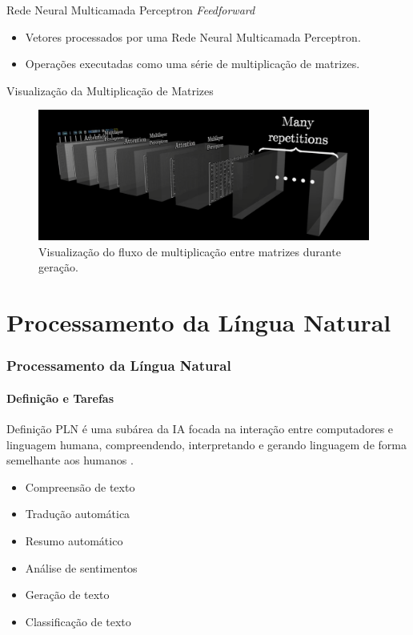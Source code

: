 \documentclass{beamer}
\begin{document}
\begin{frame}{Rede Neural Multicamada Perceptron \textit{Feedforward}}
    \begin{itemize}
        \item Vetores processados por uma Rede Neural Multicamada Perceptron.
        \item Operações executadas como uma série de multiplicação de matrizes.
    \end{itemize}
\end{frame}

\begin{frame}[allowframebreaks]{Visualização da Multiplicação de Matrizes}
    \begin{figure}[!h]
        \centering
        \includegraphics[width=4.3in]{images/Transformer inference in tokens flow.png}
        \caption{Visualização do fluxo de multiplicação entre matrizes durante geração.}
        \label{fig:VisualizacaoMatrizes.}
    \end{figure}
\end{frame}


\section{Processamento da Língua Natural}
\begin{frame}
    \frametitle{Processamento da Língua Natural}
    \framesubtitle{Definição e Tarefas}
    \begin{block}{Definição}
        PLN é uma subárea da IA focada na interação entre computadores e linguagem humana, compreendendo, interpretando e gerando linguagem de forma semelhante aos humanos \cite{hapke2019natural}.
    \end{block}
    \begin{itemize}
        \item Compreensão de texto
        \item Tradução automática
        \item Resumo automático
        \item Análise de sentimentos
        \item Geração de texto
        \item Classificação de texto
    \end{itemize}
\end{frame}
\end{document}
